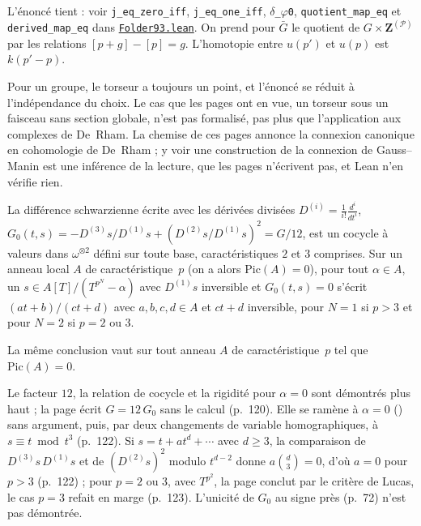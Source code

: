 \noindent L'énoncé tient : voir \texttt{j\_eq\_zero\_iff}, \texttt{j\_eq\_one\_iff}, \texttt{$\delta$\_$\varphi$0}, \texttt{quotient\_map\_eq} et \texttt{derived\_map\_eq} dans \href{\leanblob/AlgebraicGeometry/Folder93.lean}{\texttt{Folder93.\allowbreak{}lean}}. On prend pour $\bar G$ le quotient de $G \times \mathbf Z^{(\mathcal P)}$ par les relations $[p + g] - [p] = g$. L'homotopie entre $u(p')$ et $u(p)$ est $k(p' - p)$.

Pour un groupe, le torseur a toujours un point, et l'énoncé se réduit à l'indépendance du choix. Le cas que les pages ont en vue, un torseur sous un faisceau sans section globale, n'est pas formalisé, pas plus que l'application aux complexes de De~Rham. La chemise de ces pages annonce la connexion canonique en cohomologie de De~Rham ; y voir une construction de la connexion de Gauss--Manin est une inférence de la lecture, que les pages n'écrivent pas, et Lean n'en vérifie rien.

\begin{encadre}
\begin{theoreme}
La différence schwarzienne écrite avec les dérivées divisées $D^{(i)} = \frac{1}{i!}\frac{d^i}{dt^i}$, $G_0(t,s) = -D^{(3)}s/D^{(1)}s + (D^{(2)}s/D^{(1)}s)^2 = G/12$, est un cocycle à valeurs dans $\omega^{\otimes 2}$ défini sur toute base, caractéristiques $2$ et $3$ comprises. Sur un anneau local $A$ de caractéristique~$p$ (on a alors $\mathrm{Pic}(A) = 0$), pour tout $\alpha \in A$, un $s \in A[T]/(T^{p^N} - \alpha)$ avec $D^{(1)}s$ inversible et $G_0(t,s) = 0$ s'écrit $(at+b)/(ct+d)$ avec $a, b, c, d \in A$ et $ct + d$ inversible, pour $N = 1$ si $p > 3$ et pour $N = 2$ si $p = 2$ ou $3$.
\end{theoreme}
\end{encadre}

\begin{enonce}
La même conclusion vaut sur tout anneau $A$ de caractéristique~$p$ tel que $\mathrm{Pic}(A) = 0$.
\end{enonce}
\begin{demopage}[pages 120 à 123]
Le facteur $12$, la relation de cocycle et la rigidité pour $\alpha = 0$ sont démontrés plus haut ; la page écrit $G = 12\,G_0$ sans le calcul (p.~120). Elle se ramène à $\alpha = 0$ () sans argument, puis, par deux changements de variable homographiques, à $s \equiv t \bmod t^3$ (p.~122). Si $s = t + at^d + \cdots$ avec $d \geq 3$, la comparaison de $D^{(3)}s\,D^{(1)}s$ et de $(D^{(2)}s)^2$ modulo $t^{d-2}$ donne $a\binom d3 = 0$, d'où $a = 0$ pour $p > 3$ (p.~122) ; pour $p = 2$ ou $3$, avec $T^{p^2}$, la page conclut par le critère de Lucas, le cas $p = 3$ refait en marge (p.~123). L'unicité de $G_0$ au signe près (p.~72) n'est pas démontrée.
\end{demopage}

